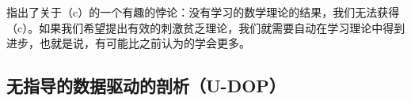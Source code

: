 
\citet[]{PS2002a}指出了关于（c）的一个有趣的悖论：没有学习的数学理论的结果，我们无法获得（c）。如果我们希望提出有效的刺激贫乏理论，我们就需要自动在学习理论中得到进步，也就是说，有可能比之前认为的学会更多。

\subsection{无指导的数据驱动的剖析（U-DOP）}
\label{Abschnitt-UDOP}

